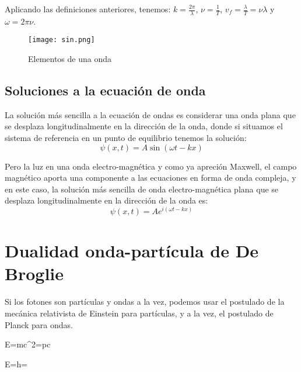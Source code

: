 Aplicando las definiciones anteriores, tenemos: $k=\frac{2\pi}{\lambda}$, $\nu=\frac{1}{T}$,
$v_f=\frac{\lambda}{T}=\nu\lambda$ y $\omega=2\pi\nu$.

\begin{figure}[htbp]
    \centering
    \texttt{[image: sin.png]}
    \caption{Elementos de una onda}
    \label{fig:elementos-onda}
\end{figure}

\subsection{Soluciones a la ecuación de onda}\label{subsec:soluciones-a-la-ecuación-de-onda}
La solución más sencilla a la ecuación de ondas es considerar una onda plana que se desplaza longitudinalmente en la dirección de la onda, donde si situamos el sistema de referencia en un punto de equilibrio tenemos la solución:
\begin{equation}
    \label{eq:solucion-ecuacion-ondas-simple}
    \psi(x,t)=A\sin(\omega t-kx)
\end{equation}

Pero la luz en una onda electro-magnética y como ya apreción Maxwell, el campo magnético aporta una componente a las ecuaciones en forma de onda compleja, y en este caso, la solución más sencilla de onda electro-magnética plana que se desplaza longitudinalmente en la dirección de la onda es:
\begin{equation}
    \label{eq:solucion-ecuacion-ondas-complejas-simple}
    \psi(x,t)=Ae^{i(\omega t-kx)}
\end{equation}

\section{Dualidad onda-partícula de De Broglie}\label{sec:dualidad-onda-partícula-de-de-broglie}

Si los fotones son partículas y ondas a la vez, podemos usar el postulado de la mecánica relativista de Einstein para partículas, y a la vez, el postulado de Planck para ondas.

\begin{postulate}
    \label{pos:energia_einstein}
    E=mc^2=pc
\end{postulate}

\begin{postulate}
    \label{pos:energia_planck}
    E=h\nu=
\end{postulate}

